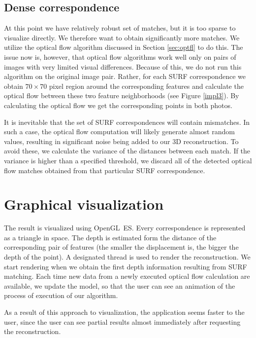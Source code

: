 
\subsection{Dense correspondence}

At this point we have relatively robust set of matches, but it is too sparse to visualize directly.
We therefore want to obtain significantly more matches. 
We utilize the optical flow algorithm discussed in Section \ref{sec:optfl} to do this.
The issue now is, however, that optical flow algorithms work well only on pairs of images with very limited visual differences. 
Because of this, we do not run this algorithm on the original image pair.
Rather, for each SURF correspondence we obtain $70 \times 70$ pixel region around the corresponding features and calculate the optical flow between these two feature neighborhoods (see Figure \ref{impl3}).
By calculating the optical flow we get the corresponding points in both photos. 

It is inevitable that the set of SURF correspondences will contain mismatches.
In such a case, the optical flow computation will likely generate almost random values, resulting in significant noise being added to our 3D reconstruction. 
To avoid these, we calculate the variance of the distances between each match.
If the variance is higher than a specified threshold, we discard all of the detected optical flow matches obtained from that particular SURF correspondence.

\section{Graphical visualization}

The result is visualized using OpenGL~ES.
Every correspondence is represented as a triangle in space.
The depth is estimated form the distance of the corresponding pair of features (the smaller the displacement is, the bigger the depth of the point). 
A designated thread is used to render the reconstruction. 
We start rendering when we obtain the first depth information resulting from SURF matching.
Each time new data from a newly executed optical flow calculation are available, we update the model, so that the user can see an animation of the process of execution of our algorithm.

As a result of this approach to visualization, the application seems faster to the user, since the user can see partial results almost immediately after requesting the reconstruction. 


